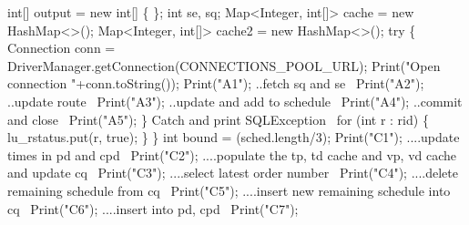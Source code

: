 \documentclass{article}
\def\nwendcode{\endtrivlist \endgroup}      %
\let\nwdocspar=\par
\theoremstyle{definition}                   %
\begin{document}
  int[] output = new int[] \{ \};
  int se, sq;
  Map<Integer, int[]> cache = new HashMap<>();
  Map<Integer, int[]> cache2 = new HashMap<>();
  try \{
    Connection conn = DriverManager.getConnection(CONNECTIONS_POOL_URL);
    Print("Open connection "+conn.toString());
    Print("A1");
    \LA{}..fetch \code{}sq\edoc{} and \code{}se\edoc{}~{\nwtagstyle{}}\RA{}
    Print("A2");
    \LA{}..update route~{\nwtagstyle{}}\RA{}
    Print("A3");
    \LA{}..update and add to schedule~{\nwtagstyle{}}\RA{}
    Print("A4");
    \LA{}..commit and close~{\nwtagstyle{}}\RA{}
    Print("A5");
  \}
  \LA{}Catch and print \code{}SQLException\edoc{}~{\nwtagstyle{}}\RA{}
  for (int r : rid) \{
    lu_rstatus.put(r, true);
  \}
\}
\eatline
{}\nwendcode{}\endmoddef{}
int bound = (sched.length/3);
Print("C1");
\LA{}....update times in pd and cpd~{\nwtagstyle{}}\RA{}
Print("C2");
\LA{}....populate the tp, td cache and vp, vd cache and update cq~{\nwtagstyle{}}\RA{}
Print("C3");
\LA{}....select latest order number~{\nwtagstyle{}}\RA{}
Print("C4");
\LA{}....delete remaining schedule from cq~{\nwtagstyle{}}\RA{}
Print("C5");
\LA{}....insert new remaining schedule into cq~{\nwtagstyle{}}\RA{}
Print("C6");
\LA{}....insert into pd, cpd~{\nwtagstyle{}}\RA{}
Print("C7");
\nwendcode{}\nwdocspar
\nwenddocs{}\endmoddef{}
\end{document}
